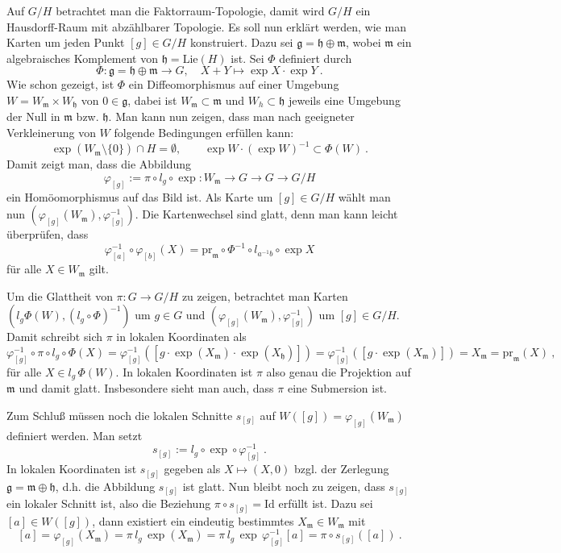 \documentclass[12pt,a4paper]{article}
\def\pr{\mathrm{pr}}
\def\Lie{\mathrm{Lie}}
\def\g{\mathfrak{g}}
\def\m{\mathfrak{m}}
\def\h{\mathfrak{h}}
\def\Id{\mathrm{Id}}
\begin{document}
\medskip

Auf $G/H$ betrachtet man die Faktorraum-Topologie, damit wird $G/H$ ein Hausdorff-Raum mit
abz\"ahlbarer Topologie. Es soll nun erkl\"art werden, wie man Karten um jeden Punkt
$[g]\in G/H$ konstruiert. Dazu sei $\g= \h \oplus \m$, wobei $\m$ ein algebraisches
Komplement von $\h= \Lie(H)$ ist. Sei $\Phi$ definiert durch
$$
\Phi : \g = \h \oplus \m \rightarrow G, \quad X + Y \mapsto \exp X \cdot \exp Y \ .
$$
Wie schon gezeigt, ist $\Phi$ ein Diffeomorphismus auf einer Umgebung
$W = W_\m \times W_\h$ von $0\in \g$, dabei ist $W_\m \subset \m$ und
$W_h \subset \h$ jeweils eine Umgebung der Null in $\m$ bzw. $\h$. Man kann nun zeigen,
dass man nach geeigneter Verkleinerung von $W$ folgende Bedingungen erf\"ullen kann:
$$
\exp(W_\m \setminus \{0\}) \cap H = \emptyset,
\qquad
\exp W \cdot (\exp W)^{-1} \subset \Phi(W) \ .
$$
Damit zeigt man, dass die Abbildung
$$
\varphi_{[g]}:= \pi \circ l_g \circ \exp: W_\m \rightarrow G \rightarrow G \rightarrow G/H
$$
ein Hom\"oomorphismus auf das Bild ist. Als Karte um $[g]\in G/H$ w\"ahlt man nun
$(\varphi_{[g]}(W_\m), \varphi_{[g]}^{-1})$. Die Kartenwechsel sind glatt, denn man
kann leicht \"uberpr\"ufen, dass
$$
\varphi^{-1}_{[a]} \circ \varphi_{[b]}(X) = \pr_\m \circ \Phi^{-1}\circ l_{a^{-1}b}\circ \exp X
$$
f\"ur alle $X\in W_\m$ gilt.

\medskip

Um die Glattheit von $\pi : G \rightarrow G/H$ zu zeigen, betrachtet man Karten
$(l_g\Phi(W), (l_g \circ \Phi)^{-1})$ um $g\in G$ und $(\varphi_{[g]}(W_\m), \varphi^{-1}_{[g]})$
um $[g]\in G/H$. Damit schreibt sich $\pi$ in lokalen Koordinaten als
$$
\varphi^{-1}_{[g]}\circ \pi \circ l_g \circ \Phi(X)
=
\varphi^{-1}_{[g]} ([g\cdot \exp(X_\m)\cdot \exp(X_\h)])
=
\varphi^{-1}_{[g]}([g\cdot \exp (X_\m)])
=
X_\m = \pr_\m(X) \ ,
$$
f\"ur alle $X \in l_g \, \Phi(W)$. In lokalen Koordinaten ist $\pi $ also genau die
Projektion auf $\m$ und damit glatt. Insbesondere sieht man auch, dass $\pi$ eine
Submersion ist.

\medskip

Zum Schlu\ss{} m\"ussen noch die lokalen Schnitte $s_{[g]}$ auf $W([g])= \varphi_{[g]}(W_\m)$
definiert werden. Man setzt
$$
s_{[g]} := l_g \circ \exp \circ \varphi^{-1}_{[g]} \ .
$$
In lokalen Koordinaten ist $s_{[g]}$ gegeben als $X \mapsto (X,0)$ bzgl. der Zerlegung
$\g = \m \oplus \h$, d.h. die Abbildung $s_{[g]}$ ist glatt. Nun bleibt noch zu zeigen,
dass $s_{[g]}$ ein lokaler Schnitt ist, also die Beziehung  $\pi \circ s_{[g]} = \Id$
erf\"ullt ist. Dazu sei $[a]\in W([g])$, dann existiert ein eindeutig bestimmtes
$X_\m \in W_\m$ mit
$$
[a] = \varphi_{[g]}(X_\m)= \pi \, l_g \, \exp (X_\m)
=
\pi \, l_g \, \exp \, \varphi^{-1}_{[g]} [a]
=
\pi \circ s_{[g]}([a]) \ .
$$
\end{document}
